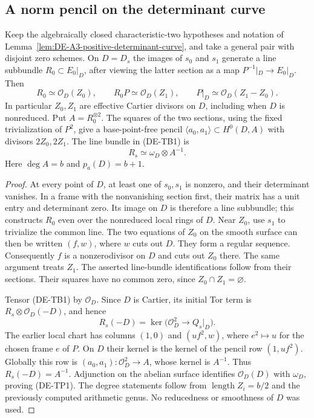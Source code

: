 \subsection{A norm pencil on the determinant curve}

\begin{lemma}
\label{lem:DE-A3-positive-pencil-candidate}
Keep the algebraically closed characteristic-two hypotheses and notation of
Lemma~\ref{lem:DE-A3-positive-determinant-curve}, and take a general pair
with disjoint zero schemes. On $D=D_s$ the images of $s_0$ and $s_1$
generate a line subbundle $R_0\subset E_0|_D$, after viewing the latter
section as a map $P^{-1}|_D\to E_0|_D$. Then
\[
 R_0\simeq\mathcal O_D(Z_0),\qquad
 R_0P\simeq\mathcal O_D(Z_1),\qquad
 P|_D\simeq\mathcal O_D(Z_1-Z_0).
\]
In particular $Z_0,Z_1$ are effective Cartier divisors on $D$, including
when $D$ is nonreduced. Put $A=R_0^{\otimes2}$. The squares of the two
sections, using the fixed trivialization of $P^2$, give a base-point-free
pencil $\langle a_0,a_1\rangle\subset H^0(D,A)$ with divisors $2Z_0,2Z_1$.
The line bundle in (DE-TB1) is
\[
                         R_s\simeq\omega_D\otimes A^{-1}.
                                                        \tag{DE-TP1}
\]
Here $\deg A=b$ and $p_a(D)=b+1$.
\end{lemma}
\begin{proof}
At every point of $D$, at least one of $s_0,s_1$ is nonzero, and their
determinant vanishes. In a frame with the nonvanishing section first,
their matrix has a unit entry and determinant zero. Its image on $D$
is therefore a line subbundle; this constructs $R_0$ even over the
nonreduced local rings of $D$. Near $Z_0$, use $s_1$ to trivialize
the common line. The two equations of $Z_0$ on the smooth surface can
then be written $(f,w)$, where $w$ cuts out $D$. They form a regular
sequence. Consequently $f$ is a nonzerodivisor on $D$ and cuts out
$Z_0$ there. The same argument treats $Z_1$. The asserted line-bundle
identifications follow from their sections. Their squares have no common
zero, since $Z_0\cap Z_1=\varnothing$.

Tensor (DE-TB1) by $\mathcal O_D$. Since $D$ is Cartier, its initial
Tor term is $R_s\otimes\mathcal O_D(-D)$, and hence
\[
 R_s(-D)=\ker\bigl(\mathcal O_D^2\longrightarrow Q_s|_D\bigr).
\]
The earlier local chart has columns $(1,0)$ and $(u f^2,w)$,
where $e^2\mapsto u$ for the chosen frame $e$ of $P$.
On $D$ their kernel is the kernel of the pencil row $(1,u f^2)$.
Globally this row is $(a_0,a_1):\mathcal O_D^2\to A$, whose kernel
is $A^{-1}$. Thus $R_s(-D)=A^{-1}$. Adjunction on the abelian surface
identifies $\mathcal O_D(D)$ with $\omega_D$, proving (DE-TP1).
The degree statements follow from $\operatorname{length}Z_i=b/2$ and
the previously computed arithmetic genus. No reducedness or smoothness
of $D$ was used.
\end{proof}


